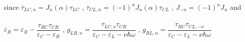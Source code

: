 since $\overline{\tau}_{LC,n} = J_n (\alpha) \tau_{LC} $ , $\overline{\tau}_{CL,n}= (-1)^{n} J_n (\alpha) \tau_{CL}$ , $J_{-n}=(-1)^n J_n$ and\\
\\


 $\overline{\varepsilon}_{R} = \varepsilon_R - \dfrac{\tau_{RC}\tau_{CR} }{ \varepsilon_C - \varepsilon_ R }$ ,  $ g_{LR,n} =  \dfrac {\overline{\tau}_{LC,\nu} \tau_{CR} } {\varepsilon_C - \varepsilon_L - \nu \hbar \omega}$ ,  $ g_{RL,n} =  \dfrac {\tau_{RC} \overline{\tau}_{CL,-\nu}  } {\varepsilon_C - \varepsilon_L - \nu \hbar \omega}$ 
